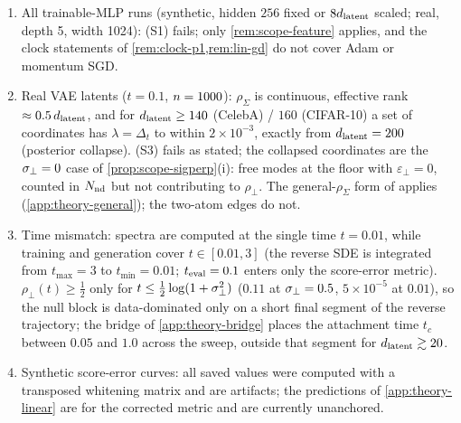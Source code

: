 \begin{remark}
\begin{enumerate}
\item All trainable-MLP runs (synthetic, hidden $256$ fixed or $8d_{\mathrm{latent}}$ scaled; real, depth 5, width 1024): (S1) fails; only \cref{rem:scope-feature} applies, and the clock statements of \cref{rem:clock-p1,rem:lin-gd} do not cover Adam or momentum SGD.
\item Real VAE latents ($t=0.1$, $n=1000$): $\rho_\Sigma$ is continuous, effective rank $\approx0.5\,d_{\mathrm{latent}}$, and for $d_{\mathrm{latent}}\ge140$ (CelebA) / $160$ (CIFAR-10) a set of coordinates has $\lambda=\Delta_t$ to within $2\times10^{-3}$, exactly from $d_{\mathrm{latent}}=200$ (posterior collapse). (S3) fails as stated; the collapsed coordinates are the $\sigma_{\perp}=0$ case of \cref{prop:scope-sigperp}(i): free modes at the floor with $\varepsilon_\perp=0$, counted in $N_{\rm nd}$ but not contributing to $\rho_\perp$. The general-$\rho_\Sigma$ form of \citet[Thm.~3.1]{bonnaire2025} applies (\cref{app:theory-general}); the two-atom edges do not.
\item Time mismatch: spectra are computed at the single time $t=0.01$, while training and generation cover $t\in[0.01,3]$ (the reverse SDE is integrated from $t_{\max}=3$ to $t_{\min}=0.01$; $t_{\rm eval}=0.1$ enters only the score-error metric). $\rho_\perp(t)\ge\tfrac12$ only for $t\le\tfrac12\log(1+\sigma_{\perp}^2)$ ($0.11$ at $\sigma_{\perp}=0.5$, $5\times10^{-5}$ at $0.01$), so the null block is data-dominated only on a short final segment of the reverse trajectory; the bridge of \cref{app:theory-bridge} places the attachment time $t_c$ between $0.05$ and $1.0$ across the sweep, outside that segment for $d_{\mathrm{latent}}\gtrsim20$.
\item Synthetic score-error curves: all saved values were computed with a transposed whitening matrix and are artifacts; the predictions of \cref{app:theory-linear} are for the corrected metric and are currently unanchored.
\end{enumerate}
\end{remark}
